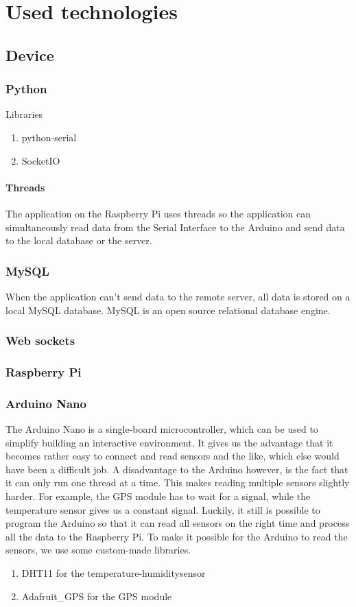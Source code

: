 \section{Used technologies}
\subsection{Device}
\subsubsection{Python}
Libraries
\begin{enumerate}
 \item python-serial
 \item SocketIO
\end{enumerate}
\paragraph{Threads}
The application on the Raspberry Pi uses threads so the application can simultaneously read data from the Serial Interface to the Arduino and send data to the local database or the server.
\subsubsection{MySQL}
When the application can't send data to the remote server, all data is stored on a local MySQL database. MySQL is an open source relational database engine.
\subsubsection{Web sockets}
\subsubsection{Raspberry Pi}
\subsubsection{Arduino Nano}
The Arduino Nano is a single-board microcontroller, which can be used to simplify building an interactive environment. It gives us the advantage that it becomes rather easy to connect and read sensors and the like, which else would have been a difficult job. A disadvantage to the Arduino however, is the fact that it can only run one thread at a time. This makes reading multiple sensors slightly harder. For example, the GPS module has to wait for a signal, while the temperature sensor gives us a constant signal. Luckily, it still is possible to program the Arduino so that it can read all sensors on the right time and process all the data to the Raspberry Pi.
To make it possible for the Arduino to read the sensors, we use some custom-made libraries.
\begin{enumerate}
 \item DHT11 for the temperature-humiditysensor
 \item Adafruit_GPS for the GPS module
\end{enumerate}

